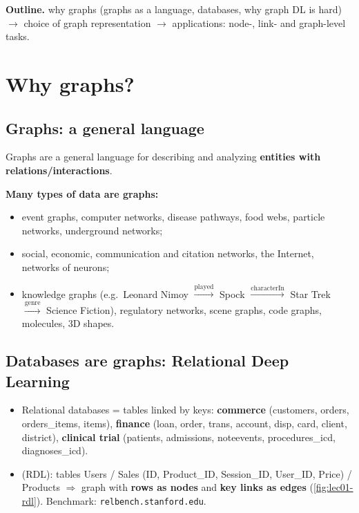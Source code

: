 \label{ch:lec01}

\textbf{Outline.}  why graphs (graphs as a language, databases,
why graph DL is hard) $\to$ choice of graph representation $\to$ applications: node-,
link- and graph-level tasks.


\section{Why graphs?}\label{sec:lec01-why-graphs}

\subsection{Graphs: a general language}\label{sec:lec01-language}

\begin{keyidea}
  Graphs are a general language for describing and analyzing \textbf{entities with
  relations/interactions}.
\end{keyidea}

\textbf{Many types of data are graphs:}
\begin{itemize}
  \item event graphs, computer networks, disease pathways, food webs, particle networks,
    underground networks;
  \item social, economic, communication and citation networks, the Internet, networks of
    neurons;
  \item knowledge graphs (e.g.\ Leonard Nimoy $\xrightarrow{\text{played}}$ Spock
    $\xrightarrow{\text{characterIn}}$ Star Trek $\xrightarrow{\text{genre}}$ Science
    Fiction), regulatory networks, scene graphs, code graphs, molecules, 3D shapes.
\end{itemize}

\subsection{Databases are graphs: Relational Deep Learning}\label{sec:lec01-rdl}

\begin{itemize}
  \item Relational databases = tables linked by keys: \textbf{commerce} (customers, orders,
    orders\_items, items), \textbf{finance} (loan, order, trans, account, disp, card,
    client, district), \textbf{clinical trial} (patients, admissions, noteevents,
    procedures\_icd, diagnoses\_icd).
  \item {} (RDL): tables Users / Sales (ID, Product\_ID,
    Session\_ID, User\_ID, Price) / Products $\Rightarrow$ graph with \textbf{rows as
    nodes} and \textbf{key links as edges} (\cref{fig:lec01-rdl}). Benchmark:
    \texttt{relbench.stanford.edu}.
\end{itemize}

